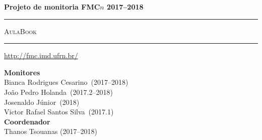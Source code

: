 \thispagestyle{empty}
\begin{center}
\Large
\parindent=0pt

\begin{flushright}
\ttfamily
\compiletime
\end{flushright}

\vspace{\stretch1}

{\bfseries\huge Projeto de monitoria FMC$n$ 2017--2018}

\vspace{5mm}

\rule{\textwidth}{2mm}

\vspace{1cm}

{\scshape\Huge AulaBook}

\vspace{1cm}

\rule{\textwidth}{2mm}

\vspace{5mm}

\url{http://fmc.imd.ufrn.br/}

\vspace{1cm}

\vspace{\stretch1}

\begin{center}
{\bfseries\sffamily Monitores}\\
Bianca Rodrigues Cesarino~(2017--2018)\\
João Pedro Holanda~(2017.2--2018)\\
Josenaldo Júnior~(2018)\\
Victor Rafael Santos Silva~(2017.1)\\[1.5em]
{\bfseries\sffamily Coordenador}\\
Thanos Tsouanas (2017--2018)\\
\end{center}

\vspace{\stretch1}

\end{center}

